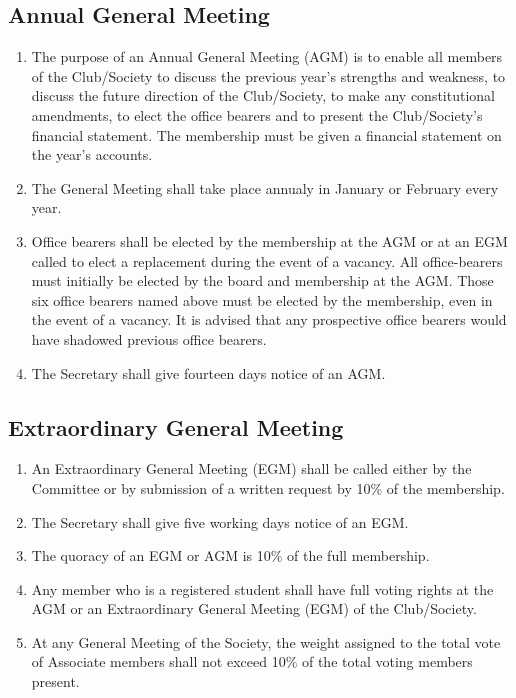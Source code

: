 \documentclass{report}
\newcommand{\bearersNo}{six}
\begin{document}
	\subsection{Annual General Meeting}
		\begin{enumerate}
			\item{The purpose of an Annual General Meeting (AGM) is to enable all members of the Club/Society to discuss the previous year’s strengths and weakness, to discuss the future direction of the Club/Society, to make any constitutional amendments, to elect the office bearers and to present the Club/Society’s financial statement. The membership must be given a financial statement on the year’s accounts. }
			\item{The General Meeting shall take place annualy in January or February every year.}
			\item{Office bearers shall be elected by the membership at the AGM or at an EGM called to elect a replacement during the event of a vacancy. All office-bearers must initially be elected by the board and membership at the AGM. Those \bearersNo{} office bearers named above must be elected by the membership, even in the event of a vacancy. It is advised that any prospective office bearers would have shadowed previous office bearers.}
			\item{The Secretary shall give fourteen days notice of an AGM.}
		\end{enumerate}
	\subsection{Extraordinary General Meeting}
		\begin{enumerate}
			\item{An Extraordinary General Meeting (EGM) shall be called either by the Committee or by submission of a written request by 10\% of the membership. }
			\item{The Secretary shall give five working days notice of an EGM.}
			\item{The quoracy of an EGM or AGM is 10\% of the full membership.}
			\item{Any member who is a registered student shall have full voting rights at the AGM or an Extraordinary General Meeting (EGM) of the Club/Society.}
			\item{At any General Meeting of the Society, the weight assigned to the total vote of Associate members shall not exceed 10\% of the total voting members present.}
		\end{enumerate}
\end{document}

